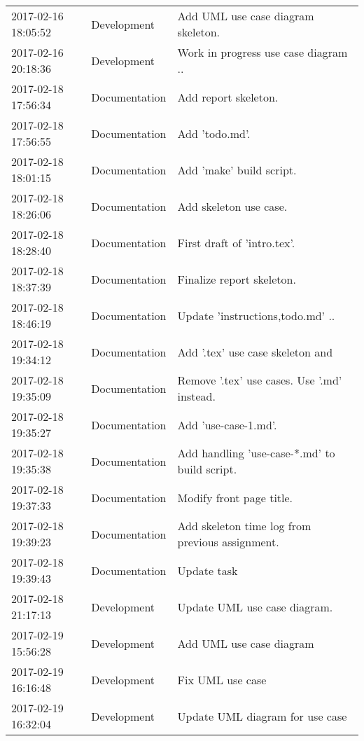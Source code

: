 \begin{table}[]
\begin{tabular}{@{}l|l|l}
    2017-02-16 18:05:52 & Development   & Add UML use case diagram skeleton.                 \\
    2017-02-16 20:18:36 & Development   & Work in progress use case diagram ..               \\
    2017-02-18 17:56:34 & Documentation & Add report skeleton.                               \\
    2017-02-18 17:56:55 & Documentation & Add 'todo.md'.                                     \\
    2017-02-18 18:01:15 & Documentation & Add 'make' build script.                           \\
    2017-02-18 18:26:06 & Documentation & Add skeleton use case.                             \\
    2017-02-18 18:28:40 & Documentation & First draft of 'intro.tex'.                        \\
    2017-02-18 18:37:39 & Documentation & Finalize report skeleton.                          \\
    2017-02-18 18:46:19 & Documentation & Update '{instructions,todo}.md' ..                 \\
    2017-02-18 19:34:12 & Documentation & Add '.tex' use case skeleton and #1 in progress.   \\
    2017-02-18 19:35:09 & Documentation & Remove '.tex' use cases. Use '.md' instead.        \\
    2017-02-18 19:35:27 & Documentation & Add 'use-case-1.md'.                               \\
    2017-02-18 19:35:38 & Documentation & Add handling 'use-case-*.md' to build script.      \\
    2017-02-18 19:37:33 & Documentation & Modify front page title.                           \\
    2017-02-18 19:39:23 & Documentation & Add skeleton time log from previous assignment.    \\
    2017-02-18 19:39:43 & Documentation & Update task #1 ..                                  \\
    2017-02-18 21:17:13 & Development   & Update UML use case diagram.                       \\
    2017-02-19 15:56:28 & Development   & Add UML use case diagram #1.                       \\
    2017-02-19 16:16:48 & Development   & Fix UML use case #1. Export .eps.                  \\
    2017-02-19 16:32:04 & Development   & Update UML diagram for use case #1..               \\

\end{tabular}
\end{table}
